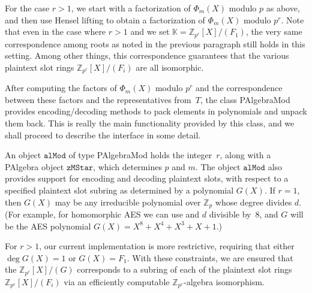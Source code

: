 \documentclass[14pt]{extarticle}
\newcommand{\victorsays}[1]{\marginnote{\small V: #1}}
\newcommand{\K}{\mathbb{K}}
\newcommand{\Z}{\mathbb{Z}}
\def\PAlgebra{\textsf{PAlgebra}}
\def\PAlgebraMod{\textsf{PAlgebraMod}}
\def\var#1{\ensuremath{\mathtt{#1}}}
\begin{document}
For the case $r > 1$, we start with a factorization
of $\Phi_m(X)$ modulo $p$ as above, and then use
Hensel lifting to obtain a factorization 
of $\Phi_m(X)$ modulo $p^r$.
Note that even in the case where $r > 1$ and we set 
$\K = \Z_{p^r}[X]/(F_1)$, the very same correspondence
among roots as noted in the previous paragraph still
holds in this setting.
Among other things, this correspondence guarantees
that the various plaintext slot rings $\Z_{p^r}[X]/(F_i)$
are all isomorphic.

After computing the factors of $\Phi_m(X)$ modulo $p^r$ and the
correspondence between these factors and the representatives from~$T$,
the class {\PAlgebraMod} provides encoding/decoding methods to pack
elements in polynomials and unpack them back. 
This is really the main functionality provided by this class,
and we shall proceed to describe the interface in some detail.


An object \var{alMod} of type {\PAlgebraMod} holds the integer~$r$,
along with a {\PAlgebra} object \var{zMStar}, which determines $p$
and $m$. The object \var{alMod} also provides
support for encoding and decoding plaintext slots, with respect
to a specified plaintext slot subring as determined by a polynomial
$G(X)$. If $r = 1$, then $G(X)$ may be any irreducible polynomial
over $\Z_p$ whose degree divides $d$. (For example, for homomorphic
AES we can use and $d$ divisible by~8, and $G$ will be the AES
polynomial $G(X)=X^8 + X^4 + X^3 + X + 1$.)

For $r > 1$, our current implementation is more restrictive,
requiring that either $\deg G(X) = 1$ or $G(X) = F_1$.
With these constraints, we are ensured that the $\Z_{p^r}[X]/(G)$
corresponds to a subring of each of the plaintext slot rings 
$\Z_{p^r}[X]/(F_i)$ via an efficiently computable 
$\Z_{p^r}$-algebra isomorphism.
\end{document}
